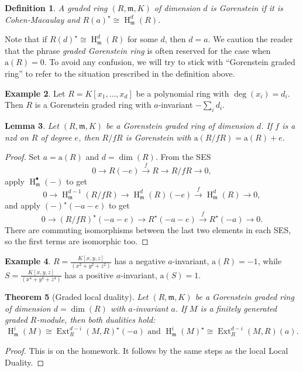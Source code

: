 \documentclass[11pt]{book}
\newtheorem{theorem}{Theorem}[chapter]
\newtheorem{lemma}[theorem]{Lemma}
\newtheorem{definition}[theorem]{Definition}
\numberwithin{equation}{section}
\numberwithin{theorem}{chapter}
\theoremstyle{definition}
\newtheorem{example}[theorem]{Example}
\newtheorem*{basic properties}{Basic Properties}
\newtheorem*{Important Remark}{Important Remark}
\theoremstyle{remark}
\newcommand{\m}{\mathfrak{m}}
\newcommand{\Ext}{\operatorname{Ext}}
\renewcommand{\dim}{\operatorname{dim}}
\newcommand{\ai}{\mathrm{a}}
\renewcommand{\H}{\operatorname{H}}
\begin{document}
\begin{definition}
A graded ring $(R,\m,K)$ of dimension $d$ is \emph{Gorenstein} if it is Cohen-Macaulay and $R(a)^\star \cong \H^d_{\m}(R)$.
\end{definition}
Note that if $R(d)^\star\cong \H^d_{\m}(R)$ for some $d$, then $d=a$. We caution the reader that the phrase \emph{graded Gorenstein ring} is often reserved for the case when $\ai(R)=0$. To avoid any confusion, we will try to stick with ``Gorenstein graded ring'' to refer to the situation prescribed in the definition above.

\begin{example} Let $R=K[x_1,\dots,x_d]$ be a polynomial ring with $\deg(x_i)=d_i$. Then $R$ is a Gorenstein graded ring with $a$-invariant $-\sum_i d_i$.
\end{example}

\begin{lemma} Let $(R,\m,K)$ be a Gorenstein graded ring of dimension $d$. If $f$ is a nzd on $R$ of degree $e$, then $R/fR$ is Gorenstein with $\ai(R/fR)=\ai(R)+e$.
\end{lemma}
\begin{proof}
	Set $a=\ai(R)$ and $d=\dim(R)$. From the SES
	\[ 0 \to R(-e) \stackrel{f}{\longrightarrow} R \to R/fR \to 0, \]
	apply $\H^{\bullet}_{\m}(-)$ to get
		\[ 0 \to \H^{d-1}_{\m}(R/fR) \to \H^d_{\m}(R)(-e) \stackrel{f}{\longrightarrow} \H^d_{\m}(R) \to 0, \]
		and apply $(-)^{\star}(-a-e)$ to get
		\[ 0 \to (R/fR)^{\star}(-a-e) \to R^{\star}(-a-e) \stackrel{f}{\longrightarrow} R^{\star}(-a) \to 0. \]
		There are commuting isomorphisms between the last two elements in each SES, so the first terms are isomorphic too.
\end{proof}

\begin{example} $R=\frac{K[x,y,z]}{(x^2+y^2+z^2)}$ has a negative $a$-invariant, $\ai(R)=-1$, while $S=\frac{K[x,y,z]}{(x^4+y^4+z^4)}$ has a positive $a$-invariant, $\ai(S)=1$.
\end{example}

\begin{theorem}[Graded local duality]
Let $(R,\m,K)$ be a Gorenstein graded ring of dimension $d=\dim(R)$ with $a$-invariant $a$. If $M$ is a finitely generated graded $R$-module, then both dualities hold:
	\[ \H^i_{\m}(M)\cong \Ext^{d-i}_R(M,R)^\star(-a) \text{ and } \H^i_{\m}(M)^\star\cong \Ext^{d-i}_R(M,R)(a).\]
\end{theorem}
\begin{proof}
	This is on the homework. It follows by the same steps as the local Local Duality.
\end{proof}
\end{document}
